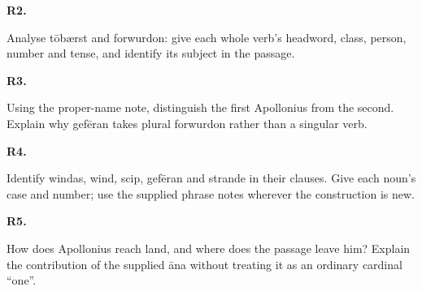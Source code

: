 \par\begin{minipage}{\linewidth}\raggedright
\textbf{R2.}

Analyse tōbærst and forwurdon: give each whole verb’s headword, class, person, number and tense, and identify its subject in the passage.

\end{minipage}\par\addvspace{4pt}

\par\begin{minipage}{\linewidth}\raggedright
\textbf{R3.}

Using the proper-name note, distinguish the first Apollonius from the second. Explain why gefēran takes plural forwurdon rather than a singular verb.

\end{minipage}\par\addvspace{4pt}

\par\begin{minipage}{\linewidth}\raggedright
\textbf{R4.}

Identify windas, wind, scip, gefēran and strande in their clauses. Give each noun’s case and number; use the supplied phrase notes wherever the construction is new.

\end{minipage}\par\addvspace{4pt}

\par\begin{minipage}{\linewidth}\raggedright
\textbf{R5.}

How does Apollonius reach land, and where does the passage leave him? Explain the contribution of the supplied āna without treating it as an ordinary cardinal “one”.

\end{minipage}\par\addvspace{4pt}

